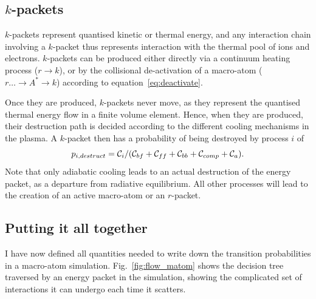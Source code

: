 \noindent

\subsection{$k$-packets}
$k$-packets represent quantised kinetic or thermal energy, and any interaction
chain involving a $k$-packet thus represents interaction with the thermal
pool of ions and electrons. $k$-packets can be produced either directly
via a continuum heating process ($r \rightarrow k$), 
or by the collisional de-activation of a macro-atom 
($r \ldots \rightarrow A^* \rightarrow k$) according to equation~\ref{eq:deactivate}. 

Once they are produced, $k$-packets never move, as they represent the quantised
thermal energy flow in a finite volume element. Hence, when they are produced,
their destruction path is decided according to the different cooling mechanisms
in the plasma. A $k$-packet then has a probability of being destroyed by process $i$ of
\begin{equation}
p_{i,destruct} = {\cal C}_i / ({\cal C}_{bf} + {\cal C}_{ff} + {\cal C}_{bb} + {\cal C}_{comp} + {\cal C}_a).
\end{equation}
Note that only adiabatic cooling leads to an actual destruction of the energy packet,
as a departure from radiative equilibrium. All other processes will lead to the 
creation of an active macro-atom or an $r$-packet.



\subsection{Putting it all together}

I have now defined all quantities needed to write down the transition 
probabilities in a macro-atom simulation. Fig.~\ref{fig:flow_matom}
shows the decision tree traversed by an energy packet in the simulation,
showing the complicated set of interactions it can undergo each time it 
scatters.

